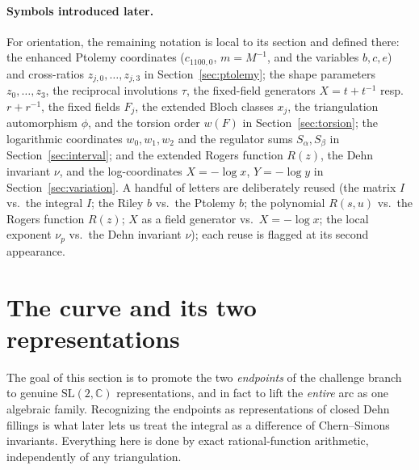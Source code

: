 \documentclass[11pt]{article}
\theoremstyle{definition}
\newcommand{\C}{\mathbb{C}}
\newcommand{\SL}{\mathrm{SL}}
\begin{document}
\paragraph{Symbols introduced later.}
For orientation, the remaining notation is local to its section and defined
there: the enhanced Ptolemy coordinates ($c_{1100,0}$, $m=M^{-1}$, and the
variables $b,c,e$) and cross-ratios $z_{j,0},\dots,z_{j,3}$ in
Section~\ref{sec:ptolemy}; the shape parameters $z_0,\dots,z_3$, the reciprocal
involutions $\tau$, the fixed-field generators $X=t+t^{-1}$ resp.\ $r+r^{-1}$,
the fixed fields $F_j$, the extended Bloch classes $x_j$, the triangulation
automorphism $\phi$, and the torsion order $w(F)$ in Section~\ref{sec:torsion};
the logarithmic coordinates $w_0,w_1,w_2$ and the regulator sums $S_\alpha,S_\beta$
in Section~\ref{sec:interval}; and the extended Rogers function $R(z)$, the Dehn
invariant $\nu$, and the log-coordinates $X=-\log x$, $Y=-\log y$ in
Section~\ref{sec:variation}.  A handful of letters are deliberately reused
(the matrix $I$ vs.\ the integral $I$; the Riley $b$ vs.\ the Ptolemy $b$; the
polynomial $R(s,u)$ vs.\ the Rogers function $R(z)$; $X$ as a field generator vs.\
$X=-\log x$; the local exponent $\nu_p$ vs.\ the Dehn invariant $\nu$); each
reuse is flagged at its second appearance.

\section{The curve and its two representations}\label{sec:endpoints}

The goal of this section is to promote the two \emph{endpoints} of the challenge
branch to genuine $\SL(2,\C)$ representations, and in fact to lift the
\emph{entire} arc as one algebraic family.  Recognizing the endpoints as
representations of closed Dehn fillings is what later lets us treat the integral
as a difference of Chern--Simons invariants.  Everything here is done by exact
rational-function arithmetic, independently of any triangulation.
\end{document}
